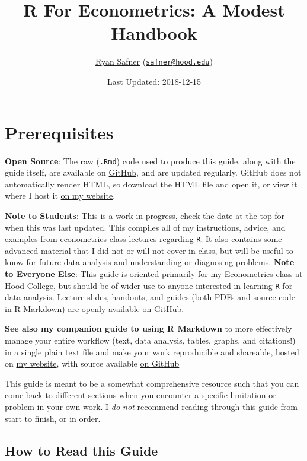\documentclass[]{book}
\title{R For Econometrics: A Modest Handbook}
\author{\href{http://ryansafner.com}{Ryan Safner}
(\href{mailto:safner@hood.edu}{\nolinkurl{safner@hood.edu}})}
\date{Last Updated: 2018-12-15}
\theoremstyle{definition}
\theoremstyle{definition}
\theoremstyle{definition}
\theoremstyle{remark}
\begin{document}
\maketitle

{
\setcounter{tocdepth}{1}
\tableofcontents
}
\chapter{Prerequisites}\label{prerequisites}

\textbf{Open Source}: The raw (\texttt{.Rmd}) code used to produce this
guide, along with the guide itself, are available on
\href{http://github.com/ryansafner/R4EH}{GitHub}, and are updated
regularly. GitHub does not automatically render HTML, so download the
HTML file and open it, or view it where I host it
\href{http://ryansafner.com/tutorial/R4EH.html}{on my website}.

\textbf{Note to Students}: This is a work in progress, check the date at
the top for when this was last updated. This compiles all of my
instructions, advice, and examples from econometrics class lectures
regarding \texttt{R}. It also contains some advanced material that I did
not or will not cover in class, but will be useful to know for future
data analysis and understanding or diagnosing problems. \textbf{Note to
Everyone Else}: This guide is oriented primarily for my
\href{http://ryansafner.com/courses/econ480}{Econometrics class} at Hood
College, but should be of wider use to anyone interested in learning
\texttt{R} for data analysis. Lecture slides, handouts, and guides (both
PDFs and source code in R Markdown) are openly available
\href{http://github.com/ryansafner/ECON480/}{on GitHub}.

\textbf{See also my companion guide to using R Markdown} to more
effectively manage your entire workflow (text, data analysis, tables,
graphs, and citations!) in a single plain text file and make your work
reproducible and shareable, hosted on
\href{http://ryansafner.com/tutorial/RMDG}{my website}, with source
available \href{http://github.com/ryansafner/RMDG}{on GitHub}

This guide is meant to be a somewhat comprehensive resource such that
you can come back to different sections when you encounter a specific
limitation or problem in your own work. I \emph{do not} recommend
reading through this guide from start to finish, or in order.

\section{How to Read this Guide}\label{how-to-read-this-guide}
\end{document}
